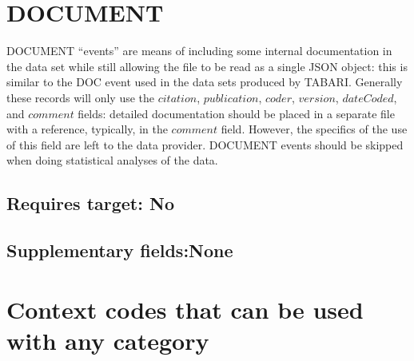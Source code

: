 \documentclass[11pt]{report}
\newcommand{\plcat}[1]{\textsf{#1}}
\begin{document}

\section{DOCUMENT}

\plcat{DOCUMENT} ``events'' are means of including some internal documentation in the data set while still allowing the file to be read as a single JSON object: this is similar to the \plcat{DOC} event used in the data sets produced by TABARI. Generally these records will only use the $citation$, $publication$, $coder$, $version$, $dateCoded$, and $comment$ fields: detailed documentation should be placed in a separate file with a reference, typically, in the $comment$ field. However, the specifics of the use of this field are left to the data provider. \plcat{DOCUMENT} events should be skipped when doing statistical analyses of the data. 

\subsection{Requires target: No}

\subsection{Supplementary fields:None}


\section{Context codes that can be used with any category}
\end{document}
